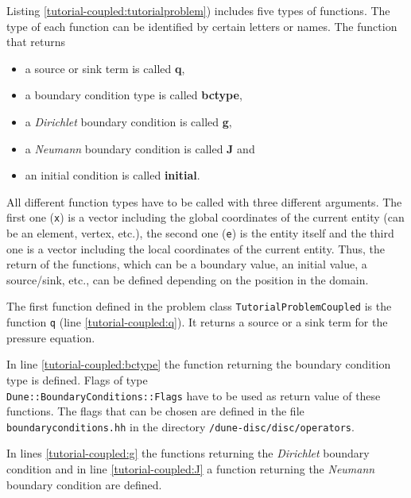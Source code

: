 \begin{lst}\label{tutorial-coupled:problemfile} \mbox{}

\end{lst}

Listing \ref{tutorial-coupled:tutorialproblem}) includes five types of functions. The type of each function can be identified by certain letters or names. The function that returns
\begin{itemize}
 \item a source or sink term is called \textbf{q},
 \item a boundary condition type is called \textbf{bctype},
 \item a \textit{Dirichlet} boundary condition is called \textbf{g},
 \item a \textit{Neumann} boundary condition is called \textbf{J} and
 \item an initial condition is called \textbf{initial}.
\end{itemize}

All different function types have to be called with three different arguments. The first one (\texttt{x}) is a vector including the global coordinates of the current entity (can be an element, vertex, etc.), the second
one (\texttt{e}) is the entity itself and the third one is a vector including the local coordinates of the current entity. Thus, the return of the functions, which can be a boundary value, an initial value, a source/sink, etc., can be defined depending on the position in the domain.

The first function defined in the problem class \texttt{TutorialProblemCoupled} is the function \texttt{q} (line \ref{tutorial-coupled:q}). It returns a source or a sink term for the pressure equation.

In line \ref{tutorial-coupled:bctype} the function returning the boundary condition type is defined. 
Flags of type \\
\texttt{Dune::BoundaryConditions::Flags} have to be used as return value of these functions. 
The flags that can be chosen are defined in the file \texttt{boundaryconditions.hh} in the directory \texttt
{/dune-disc/disc/operators}.

In lines \ref{tutorial-coupled:g} the functions returning the \textit{Dirichlet} boundary condition and
in line \ref{tutorial-coupled:J} a function returning the \textit{Neumann} boundary condition are defined.

